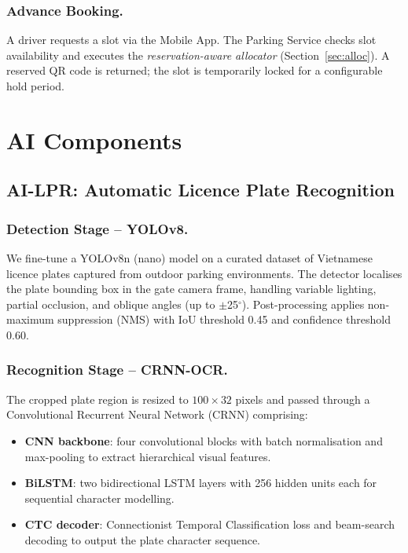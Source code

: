 \documentclass[runningheads]{llncs}
\begin{document}
\subsubsection{Advance Booking.}

A driver requests a slot via the Mobile App. The Parking
Service checks slot availability and executes the
\emph{reservation-aware allocator} (Section~\ref{sec:alloc}).
A reserved QR code is returned; the slot is temporarily
locked for a configurable hold period.

\section{AI Components}
\label{sec:ai}

\subsection{AI-LPR: Automatic Licence Plate Recognition}
\label{sec:lpr}

\subsubsection{Detection Stage -- YOLOv8.}

We fine-tune a YOLOv8n (nano) model on a curated dataset of
Vietnamese licence plates captured from outdoor parking
environments. The detector localises the plate bounding box
in the gate camera frame, handling variable lighting,
partial occlusion, and oblique angles (up to
$\pm$25$^\circ$). Post-processing applies non-maximum
suppression (NMS) with IoU threshold 0.45 and confidence
threshold 0.60.

\subsubsection{Recognition Stage -- CRNN-OCR.}

The cropped plate region is resized to $100 \times 32$ pixels
and passed through a Convolutional Recurrent Neural Network
(CRNN) comprising:
\begin{itemize}
  \item \textbf{CNN backbone}: four convolutional blocks with
        batch normalisation and max-pooling to extract
        hierarchical visual features.
  \item \textbf{BiLSTM}: two bidirectional LSTM layers with
        256 hidden units each for sequential character
        modelling.
  \item \textbf{CTC decoder}: Connectionist Temporal
        Classification loss and beam-search decoding to output
        the plate character sequence.
\end{itemize}
\end{document}
